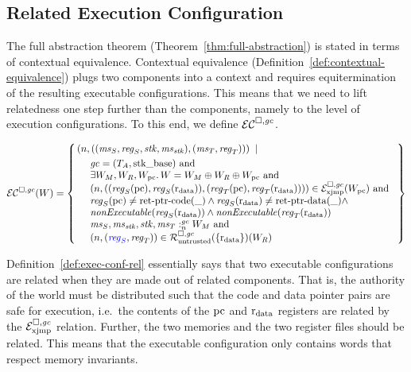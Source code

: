 \begin{jversion}
\subsection{Related Execution Configuration}
The full abstraction theorem (Theorem~\ref{thm:full-abstraction}) is stated in terms of contextual equivalence.
Contextual equivalence (Definition~\ref{def:contextual-equivalence}) plugs two components into a context and requires equitermination of the resulting executable configurations.
This means that we need to lift relatedness one step further than the components, namely to the level of execution configurations.
To this end, we define $\mathcal{EC}^{\square,\mathit{gc}}$.
\begin{definition}
\label{def:exec-conf-rel}
  \[
  \lrec(W) = \left\{
    \begin{multlined}
\npair{\left(
        (\ms_S,\reg_S,\stk,\ms_\stk),
        (\ms_T,\reg_T)\right)} \; \mid \; \\
    \begin{array}{l}
      \gc = (\ta,\stkb) \tand\\
      \exists W_M,W_R,W_\pcreg \ldotp W = W_M \oplus W_R \oplus W_\pcreg \tand\\
      \npair{( (\reg_S(\pcreg),\reg_S(\rdata)), (\reg_T(\pcreg),\reg_T(\rdata)) )} \in \lrexj(W_\pcreg) \tand \\
      \reg_S(\pcreg) \neq \retptrc(\_) \wedge 
      \reg_S(\rdata) \neq \retptrd(\_) \wedge \\
      \nonExec{\reg_S(\rdata)} \wedge
      \nonExec{\reg_T(\rdata)}\\
      \memSat{\ms_S,\ms_\stk,\stk,\ms_T}{W_M} \tand\\
      \npair{\stpair{\reg}{\reg}} \in \lrr(\{\rdata\})(W_R)
    \end{array}
  \end{multlined}
\right\}
\]
\end{definition}
Definition~\ref{def:exec-conf-rel} essentially says that two executable configurations are related when they are made out of related components.
That is, the authority of the world must be distributed such that the code and data pointer pairs are safe for execution, i.e.\ the contents of the $\mathrm{pc}$ and $\mathrm{r}_\mathrm{data}$ registers are related by the $\mathcal{E}^{\square,\mathit{gc}}_{\mathrm{xjmp}}$ relation.
Further, the two memories and the two register files should be related.
This means that the executable configuration only contains words that respect memory invariants.

\end{jversion}

